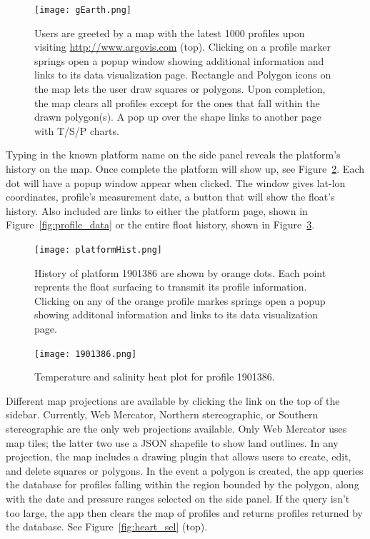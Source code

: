 \begin{figure}[ht]
\begin{minipage}{6in}
\centering
\texttt{[image: gEarth.png]}
\caption{\label{fig:main_page} Users are greeted by a map with the latest 1000 profiles upon visiting \url{http://www.argovis.com} (top). Clicking on a profile marker springs open a popup window showing additional information and links to its data visualization page. Rectangle and Polygon icons on the map lets the user draw squares or polygons. Upon completion, the map clears all profiles except for the ones that fall within the drawn polygon(s). A pop up over the shape links to another page with T/S/P charts.}
\end{minipage}
\end{figure}
Typing in the known platform name on the side panel reveals the platform's history on the map. Once complete the platform will show up, see Figure~\ref{fig:prof_hist}. Each dot will have a popup window appear when clicked. The window gives lat-lon coordinates, profile's measurement date, a button that will show the float's history. Also included are links to either the platform page, shown in Figure~\ref{fig:profile_data} or the entire float history, shown in Figure~\ref{fig:platform_data}.

\begin{figure}[ht]
\centering
\begin{minipage}{6in}
\texttt{[image: platformHist.png]}
\caption{\label{fig:prof_hist} History of platform 1901386 are shown by orange dots. Each point reprents the float surfacing to transmit its profile information. Clicking on any of the orange profile markes springs open a popup showing additonal information and links to its data visualization page.}
\end{minipage}
\end{figure}

\begin{figure}[ht]
\centering
\begin{minipage}{6in}
\texttt{[image: 1901386.png]}
\caption{\label{fig:platform_data}Temperature and salinity heat plot for profile 1901386.}
\end{minipage}
\end{figure}

Different map projections are available by clicking the link on the top of the sidebar. Currently, Web Mercator, Northern stereographic, or Southern stereographic are the only web projections available. Only Web Mercator uses map tiles; the latter two use a JSON shapefile to show land outlines. In any projection, the map includes a drawing plugin that allows users to create, edit, and delete squares or polygons. In the event a polygon is created, the app queries the database for profiles falling within the region bounded by the polygon, along with the date and pressure ranges selected on the side panel. If the query isn't too large, the app then clears the map of profiles and returns profiles returned by the database. See Figure~\ref{fig:heart_sel} (top).

